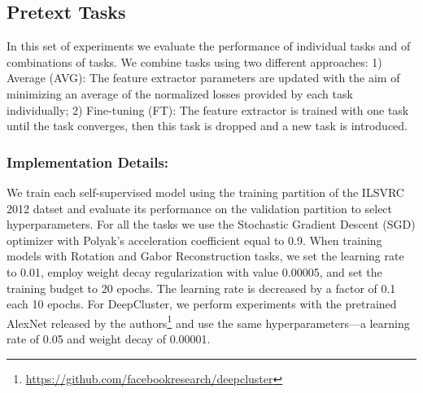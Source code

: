 \documentclass[runningheads]{llncs}
\begin{document}
\subsection{Pretext Tasks}
In this set of experiments we evaluate the performance of individual tasks and of combinations of tasks. We combine tasks using two different approaches: 1) Average (AVG): The feature extractor parameters are updated with the aim of minimizing an average of the normalized losses provided by each task individually; 2) Fine-tuning (FT): The feature extractor is trained with one task until the task converges, then this task is dropped and a new task is introduced. \vspace{-5pt}

\vspace{-5pt}\subsubsection{Implementation Details:} We train each self-supervised model using the training partition of the ILSVRC 2012 datset and evaluate its performance on the validation partition to select hyperparameters. For all the tasks we use the Stochastic Gradient Descent (SGD) optimizer with Polyak's acceleration coefficient equal to 0.9. When training models with Rotation and Gabor Reconstruction tasks, we set the learning rate to 0.01, employ weight decay regularization with value 0.00005, and set the training budget to 20 epochs. The learning rate is decreased by a factor of 0.1 each 10 epochs. For DeepCluster, we perform experiments with the pretrained AlexNet released by the authors\footnote{\url{https://github.com/facebookresearch/deepcluster}} and use the same hyperparameters---a learning rate of 0.05 and weight decay of 0.00001. 
\end{document}
